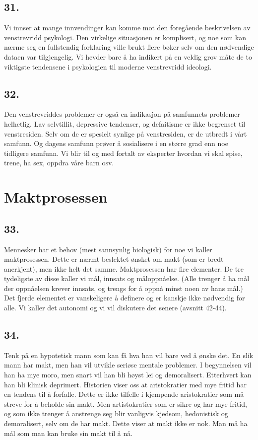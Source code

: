 \documentclass[oneside]{book}
\begin{document}
\section*{31.}
Vi innser at mange innvendinger kan komme mot den foregående beskrivelsen av
venstrevridd psykologi. Den virkelige situasjonen er komplisert, og noe som kan
nærme seg en fullstendig forklaring ville brukt flere bøker selv om den
nødvendige dataen var tilgjengelig. Vi hevder bare å ha indikert på en veldig
grov måte de to viktigste tendensene i psykologien til moderne venstrevridd
ideologi.

\section*{32.}
Den venstrevriddes problemer er også en indikasjon på samfunnets problemer
helhetlig. Lav selvtillit, depressive tendenser, og defaitisme er ikke
begrenset til venstresiden. Selv om de er spesielt synlige på venstresiden, er
de utbredt i vårt samfunn. Og dagens samfunn prøver å sosialisere i en større
grad enn noe tidligere samfunn. Vi blir til og med fortalt av eksperter hvordan
vi skal spise, trene, ha sex, oppdra våre barn osv.

\chapter{Maktprosessen}
\section*{33.}
Mennesker har et behov (mest sannsynlig biologisk) for noe vi kaller
maktprosessen. Dette er nærmt beslektet ønsket om makt (som er bredt
anerkjent), men ikke helt det samme. Maktprosessen har fire elementer. De tre
tydeligste av disse kaller vi mål, innsats og måloppnåelse. (Alle trenger å ha
mål der oppnåelsen krever innsats, og trengs for å oppnå minst noen av hans
mål.) Det fjerde elementet er vanskeligere å definere og er kanskje ikke
nødvendig for alle. Vi kaller det autonomi og vi vil diskutere det senere
(avsnitt 42-44).

\section*{34.}
Tenk på en hypotetisk mann som kan få hva han vil bare ved å ønske det. En slik
mann har makt, men han vil utvikle seriøse mentale problemer. I begynnelsen vil
han ha mye moro, men snart vil han bli høyst lei og demoralisert. Etterhvert
kan han bli klinisk deprimert. Historien viser oss at aristokratier med mye
fritid har en tendens til å forfalle. Dette er ikke tilfelle i kjempende
aristokratier som må streve for å beholde sin makt. Men artistokratier som er
sikre og har mye fritid, og som ikke trenger å anstrenge seg blir vanligvis
kjedsom, hedonistisk og demoralisert, selv om de har makt. Dette viser at makt
ikke er nok. Man må ha mål som man kan bruke sin makt til å nå.
\end{document}
